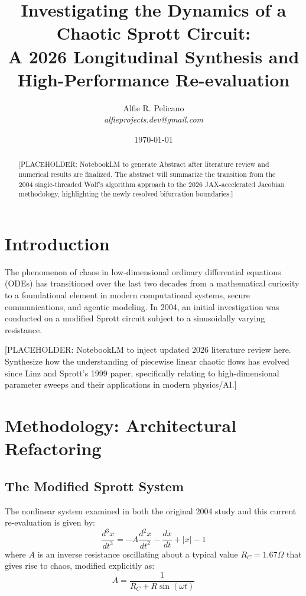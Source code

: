\documentclass[11pt, a4paper]{article}
\title{Investigating the Dynamics of a Chaotic Sprott Circuit:\\A 2026 Longitudinal Synthesis and High-Performance Re-evaluation}
\author{Alfie R. Pelicano\\ \textit{alfieprojects.dev@gmail.com}}
\date{\today}
\begin{document}
\maketitle

\begin{abstract}
[PLACEHOLDER: NotebookLM to generate Abstract after literature review and numerical results are finalized. The abstract will summarize the transition from the 2004 single-threaded Wolf's algorithm approach to the 2026 JAX-accelerated Jacobian methodology, highlighting the newly resolved bifurcation boundaries.]
\end{abstract}

\section{Introduction}
\label{sec:intro}
The phenomenon of chaos in low-dimensional ordinary differential equations (ODEs) has transitioned over the last two decades from a mathematical curiosity to a foundational element in modern computational systems, secure communications, and agentic modeling. In 2004, an initial investigation was conducted on a modified Sprott circuit subject to a sinusoidally varying resistance. 

[PLACEHOLDER: NotebookLM to inject updated 2026 literature review here. Synthesize how the understanding of piecewise linear chaotic flows has evolved since Linz and Sprott's 1999 paper, specifically relating to high-dimensional parameter sweeps and their applications in modern physics/AI.]

\section{Methodology: Architectural Refactoring}
\label{sec:methodology}

\subsection{The Modified Sprott System}
The nonlinear system examined in both the original 2004 study and this current re-evaluation is given by:
\begin{equation}
\frac{d^3x}{dt^3} = -A\frac{d^2x}{dt^2} - \frac{dx}{dt} + |x| - 1
\end{equation}
where $A$ is an inverse resistance oscillating about a typical value $R_C = 1.67\Omega$ that gives rise to chaos, modified explicitly as:
\begin{equation}
A = \frac{1}{R_C + R\sin(\omega t)}
\end{equation}
\end{document}
